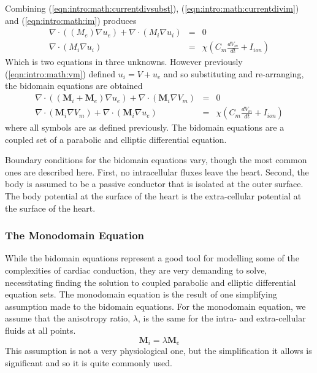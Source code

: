 Combining (\ref{eqn:intro:math:currentdivsubst}),
(\ref{eqn:intro:math:currentdivim}) and (\ref{eqn:intro:math:im}) produces
\begin{subequations}
\label{eqn:intro:math:bidom3}
\begin{align}
\nabla\cdot\left(\left(M_{e}\right)\nabla u_{e}\right) + \nabla\cdot\left(M_{i}\nabla u_{i}\right) &=& 0
\label{eqn:intro:math:bidom31}\\
\nabla\cdot\left(M_{i}\nabla u_{i}\right) &=& \chi \left(C_{m}\frac{dV_{m}}{dt} + I_{ion}\right)
\label{eqn:intro:math:bidom32}
\end{align}
\end{subequations}
Which is two equations in three unknowns.  However previously
(\ref{eqn:intro:math:vm}) defined $u_i = V + u_e$ and so substituting and
re-arranging, the bidomain equations are obtained
\begin{subequations}
\label{eqn:intro:math:bidom}
\begin{align}
\nabla\cdot\left(\left(\mathbf{M}_{i}+\mathbf{M}_{e}\right)\nabla u_{e}\right) + \nabla\cdot\left( \mathbf{M}_{i}\nabla V_{m}\right) &=& 0
\label{eqn:intro:math:bidom1}\\
\nabla\cdot\left(\mathbf{M}_{i}\nabla V_{m}\right) + \nabla\cdot\left(\mathbf{M}_{i}\nabla u_{e}\right) &=& \chi \left(C_{m}\frac{dV_{m}}{dt} + I_{ion}\right)
\label{eqn:intro:math:bidom2}
\end{align}
\end{subequations}
where all symbols are as defined previously.
The bidomain equations are a coupled set of a parabolic and elliptic differential equation.

Boundary conditions for the bidomain equations vary, though the most common ones are described here.
First, no intracellular fluxes leave the heart.
Second, the body is assumed to be a passive conductor that is isolated at the outer surface.
The body potential at the surface of the heart is the extra-cellular potential at the surface of the heart.

\subsubsection{The Monodomain Equation}
\label{sec:intro:math:mono}

While the bidomain equations represent a good tool for modelling some of the complexities of cardiac conduction, they are very demanding to solve, necessitating finding the solution to coupled parabolic and elliptic differential equation sets.
The monodomain equation is the result of one simplifying assumption made to the bidomain equations.
For the monodomain equation, we assume that the anisotropy ratio, $\lambda$, is the same for the intra- and extra-cellular fluids at all points.
\begin{equation}
\mathbf{M}_{i} = {\lambda}\mathbf{M}_{e}
\label{eqn:intro:math:mratio}
\end{equation}
This assumption is not a very physiological one, but the simplification it
allows is significant and so it is quite commonly used.

